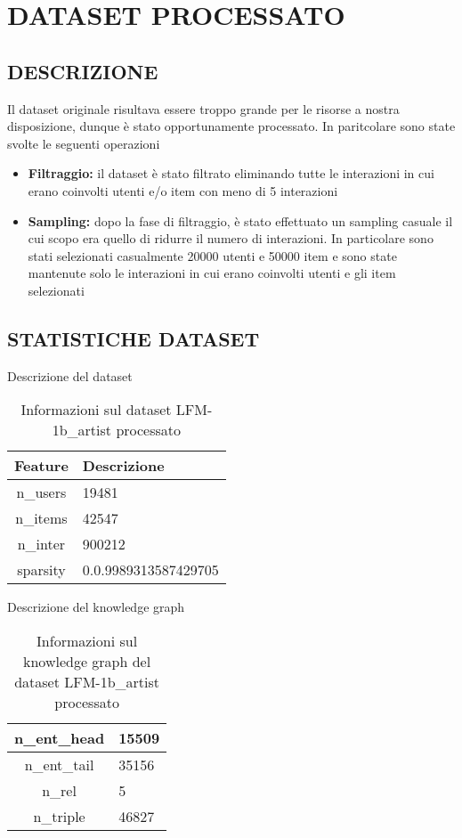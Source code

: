\section*{DATASET PROCESSATO}

\subsection*{DESCRIZIONE}

\noindent Il dataset originale risultava essere troppo grande per le risorse a nostra disposizione, dunque è stato opportunamente processato. In paritcolare sono state svolte le seguenti operazioni
\begin{itemize}
    \item \textbf{Filtraggio:} il dataset è stato filtrato eliminando tutte le interazioni in cui erano coinvolti utenti e/o item con meno di 5 interazioni
    \item \textbf{Sampling:} dopo la fase di filtraggio, è stato effettuato un sampling casuale il cui scopo era quello di ridurre il numero di interazioni. In particolare sono stati selezionati casualmente 20000 utenti e 50000 item e sono state mantenute solo le interazioni in cui erano coinvolti utenti e gli item selezionati
\end{itemize}

\subsection*{STATISTICHE DATASET}


Descrizione del dataset
\begin{table}[H]
    \centering
    \begin{tabularx}{\textwidth}{|c|X|}
        \hline
        \textbf{Feature} & \textbf{Descrizione} \\
        \hline
        n\_users & 19481 \\
        \hline
        n\_items & 42547 \\
        \hline
        n\_inter & 900212 \\
        \hline
        sparsity & 0.0.9989313587429705 \\
        \hline
    \end{tabularx}
    \caption{Informazioni sul dataset LFM-1b\_artist processato}
    \label{tab:dataset_info}
\end{table}


\noindent Descrizione del knowledge graph
\begin{table}[H]
    \centering
    \begin{tabularx}{\textwidth}{|c|X|}
        \hline
        n\_ent\_head & 15509 \\
        \hline
        n\_ent\_tail & 35156 \\
        \hline
        n\_rel & 5 \\
        \hline
        n\_triple & 46827 \\
        \hline
    \end{tabularx}
    \caption{Informazioni sul knowledge graph del dataset LFM-1b\_artist processato}
    \label{tab:dataset_info}
\end{table}

